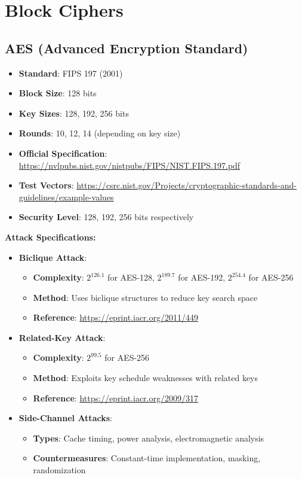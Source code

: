 \documentclass[11pt,a4paper]{article}
\begin{document}
\section{Block Ciphers}

\subsection{AES (Advanced Encryption Standard)}
\begin{itemize}
    \item \textbf{Standard}: FIPS 197 (2001)
    \item \textbf{Block Size}: 128 bits
    \item \textbf{Key Sizes}: 128, 192, 256 bits
    \item \textbf{Rounds}: 10, 12, 14 (depending on key size)
    \item \textbf{Official Specification}: \url{https://nvlpubs.nist.gov/nistpubs/FIPS/NIST.FIPS.197.pdf}
    \item \textbf{Test Vectors}: \url{https://csrc.nist.gov/Projects/cryptographic-standards-and-guidelines/example-values}
    \item \textbf{Security Level}: 128, 192, 256 bits respectively
\end{itemize}

\textbf{Attack Specifications:}
\begin{itemize}
    \item \textbf{Biclique Attack}: 
    \begin{itemize}
        \item \textbf{Complexity}: $2^{126.1}$ for AES-128, $2^{189.7}$ for AES-192, $2^{254.4}$ for AES-256
        \item \textbf{Method}: Uses biclique structures to reduce key search space
        \item \textbf{Reference}: \url{https://eprint.iacr.org/2011/449}
    \end{itemize}
    \item \textbf{Related-Key Attack}: 
    \begin{itemize}
        \item \textbf{Complexity}: $2^{99.5}$ for AES-256
        \item \textbf{Method}: Exploits key schedule weaknesses with related keys
        \item \textbf{Reference}: \url{https://eprint.iacr.org/2009/317}
    \end{itemize}
    \item \textbf{Side-Channel Attacks}: 
    \begin{itemize}
        \item \textbf{Types}: Cache timing, power analysis, electromagnetic analysis
        \item \textbf{Countermeasures}: Constant-time implementation, masking, randomization
    \end{itemize}
\end{itemize}
\end{document}
